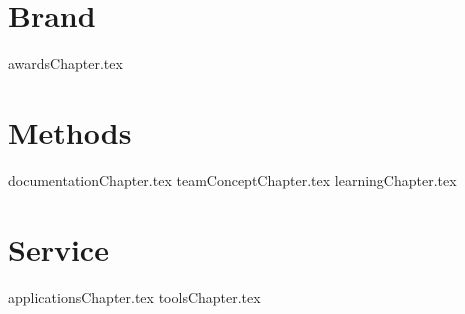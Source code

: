 \documentclass[letterpaper, 12pt]{memoir}  %
\begin{document}
\frontmatter %
\pagestyle{plain} %
\begin{titlingpage}
\titleM  %
\end{titlingpage}
\setmarginnotes{.1in}{.4in}{.1in}
\setulmarginsandblock{1in}{1in}{*}
\checkandfixthelayout
\makeatletter
\ch@ngetext
\makeatother
\tableofcontents %
\mainmatter %
\pagestyle{jalapenoPageStyleA} %
\part{Brand}
{awardsChapter.tex}
\part{Methods}
{documentationChapter.tex}
{teamConceptChapter.tex}
{learningChapter.tex}
\part{Service}
{applicationsChapter.tex}
{toolsChapter.tex}
\end{document}
